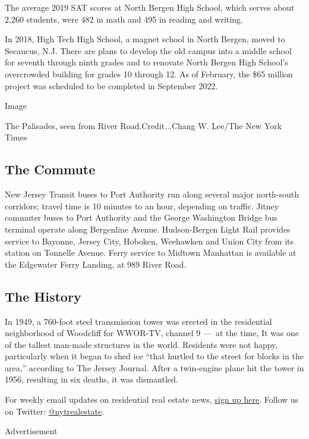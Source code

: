 The average 2019 SAT scores at North Bergen High School, which serves
about 2,260 students, were 482 in math and 495 in reading and writing.

In 2018, High Tech High School, a magnet school in North Bergen, moved
to Secaucus, N.J. There are plans to develop the old campus into a
middle school for seventh through ninth grades and to renovate North
Bergen High School's overcrowded building for grades 10 through 12. As
of February, the \$65 million project was scheduled to be completed in
September 2022.

Image

The Palisades, seen from River Road.Credit...Chang W. Lee/The New York
Times

\hypertarget{the-commute}{%
\subsection{The Commute}\label{the-commute}}

New Jersey Transit buses to Port Authority run along several major
north-south corridors; travel time is 10 minutes to an hour, depending
on traffic. Jitney commuter buses to Port Authority and the George
Washington Bridge bus terminal operate along Bergenline Avenue.
Hudson-Bergen Light Rail provides service to Bayonne, Jersey City,
Hoboken, Weehawken and Union City from its station on Tonnelle Avenue.
Ferry service to Midtown Manhattan is available at the Edgewater Ferry
Landing, at 989 River Road.

\hypertarget{the-history}{%
\subsection{The History}\label{the-history}}

In 1949, a 760-foot steel transmission tower was erected in the
residential neighborhood of Woodcliff for WWOR-TV, channel 9 ---~at the
time, It was one of the tallest man-made structures in the world.
Residents were not happy, particularly when it began to shed ice ``that
hurtled to the street for blocks in the area,'' according to The Jersey
Journal. After a twin-engine plane hit the tower in 1956, resulting in
six deaths, it was dismantled.

For weekly email updates on residential real estate news,
\href{http://www.nytimes.com/newsletters/realestate/}{sign up here}.
Follow us on Twitter:
\href{https://twitter.com/nytrealestate}{@nytrealestate}.

Advertisement

